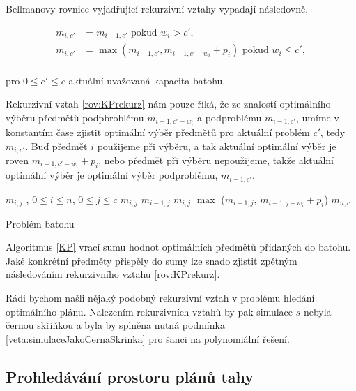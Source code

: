 Bellmanovy rovnice vyjadřující rekurzivní vztahy vypadají následovně,

\begin{definice}\label{rov:KPrekurz}
  \begin{align*}
    m_{i, c'} &= m_{i - 1, c'} \text{ pokud } w_i > c', \\
    m_{i, c'} &= \max (m_{i - 1, c'}, m_{i - 1, c' - w_i} + p_i) \text{ pokud } w_i \leq c',
  \end{align*}
  \\
  pro $0 \leq c' \leq c$ aktuální uvažovaná kapacita batohu.
\end{definice}

Rekurzivní vztah \ref{rov:KPrekurz} nám pouze říká, že ze znalostí optimálního výběru předmětů podpbroblému $m_{i-1, c' - w_i}$ a podproblému $m_{i - 1, c'}$,
umíme v konstantím čase zjistit optimální výběr předmětů pro aktuální problém $c'$, tedy $m_{i, c'}$.
Buď předmět $i$ použijeme při výběru, a tak aktuální optimální výběr je roven $m_{i - 1, c' - w_i} + p_i$,
nebo předmět při výběru nepoužijeme, takže aktuální optimální výběr je optimální výběr podproblému, $m_{i - 1, c'}$. 

\begin{algorithm}[h]
  \begin{algorithmic}[1]
    \State $m_{i, j}$ , $0 \leq i \leq n$, $0 \leq j \leq c$
          \State $m_{i, j}$ \gets $m_{i - 1, j}$
        \Else
          \State $m_{i, j}$ \gets $\max$ ($m_{i - 1, j}$, $m_{i - 1, j - w_i} + p_i$)
        \EndIf
      \EndFor
    \EndFor
    \State \Return $m_{n,c}$
  \EndFunction
  \end{algorithmic}
  \caption{Problém batohu}
  \label{KP}
\end{algorithm}

Algoritmus \ref{KP} vrací sumu hodnot optimálních předmětů přidaných do batohu.
Jaké konkrétní předměty přispěly do sumy lze snado zjistit zpětným následováním rekurzivního vztahu \ref{rov:KPrekurz}.

Rádi bychom našli nějaký podobný rekurzivní vztah v problému hledání optimálního plánu.
Nalezením rekurzivních vztahů by pak simulace $s$ nebyla černou skříňkou a byla by splněna nutná podmínka \ref{veta:simulaceJakoCernaSkrinka} pro šanci na polynomiální řešení.

\subsection{Prohledávání prostoru plánů tahy}

